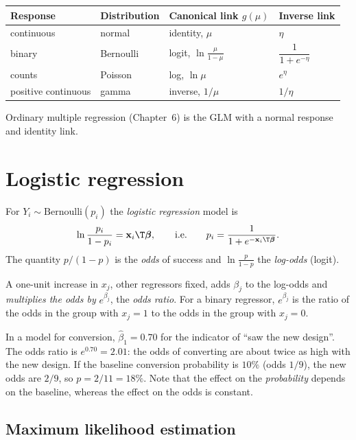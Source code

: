 \begin{center}
\begin{tabular}{llll}
\toprule
Response & Distribution & Canonical link $g(\mu)$ & Inverse link\\
\midrule
continuous & normal & identity, $\mu$ & $\eta$\\
binary & Bernoulli & logit, $\ln\frac\mu{1-\mu}$ & $\dfrac1{1+e^{-\eta}}$\\
counts & Poisson & log, $\ln\mu$ & $e^\eta$\\
positive continuous & gamma & inverse, $1/\mu$ & $1/\eta$\\
\bottomrule
\end{tabular}
\end{center}

Ordinary multiple regression (Chapter~6) is the GLM with a normal response and identity link.

\section{Logistic regression}

For $Y_i\sim\mathrm{Bernoulli}(p_i)$ the \emph{logistic regression} model is
\[ \ln\frac{p_i}{1-p_i}=\mathbf{x}_i\T\boldsymbol\beta,\qquad\text{i.e.}\qquad p_i=\frac1{1+e^{-\mathbf{x}_i\T\boldsymbol\beta}}. \]
The quantity $p/(1-p)$ is the \emph{odds} of success and $\ln\frac p{1-p}$ the \emph{log-odds} (logit).

\begin{theorem}\label{thm:logit-interp}
A one-unit increase in $x_j$, other regressors fixed, adds $\beta_j$ to the log-odds and \emph{multiplies the odds by} $e^{\beta_j}$, the \emph{odds ratio}. For a binary regressor, $e^{\beta_j}$ is the ratio of the odds in the group with $x_j=1$ to the odds in the group with $x_j=0$.
\end{theorem}

\begin{example}
In a model for conversion, $\hat\beta_1=0.70$ for the indicator of ``saw the new design''. The odds ratio is $e^{0.70}=2.01$: the odds of converting are about twice as high with the new design. If the baseline conversion probability is $10\%$ (odds $1/9$), the new odds are $2/9$, so $p=2/11=18\%$. Note that the effect on the \emph{probability} depends on the baseline, whereas the effect on the odds is constant.
\end{example}

\subsection{Maximum likelihood estimation}

